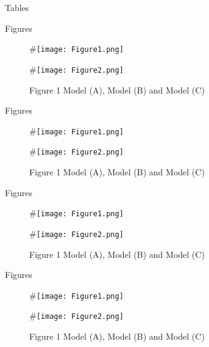 \begin{frame}[t]
\begin{columns}[t]
\begin{column}{\onecolwid}
\begin{alertblock}{Tables}
\end{alertblock}
\begin{alertblock}{Figures}
\begin{figure}[H]
	\centering
	\begin{minipage}[b]{0.5\linewidth}
		#\texttt{[image: Figure1.png]}
	\end{minipage}\hfill
	\begin{minipage}[b]{0.5\linewidth}
		#\texttt{[image: Figure2.png]}
	\end{minipage}\hfill
	\caption{Figure 1 Model (A), Model (B) and Model (C)}
	\label{fig:Figure1}
\end{figure}
\end{alertblock}

\begin{alertblock}{Figures}
\begin{figure}[H]
	\centering
	\begin{minipage}[b]{0.5\linewidth}
		#\texttt{[image: Figure1.png]}
	\end{minipage}\hfill
	\begin{minipage}[b]{0.5\linewidth}
		#\texttt{[image: Figure2.png]}
	\end{minipage}\hfill
	\caption{Figure 1 Model (A), Model (B) and Model (C)}
	\label{fig:Figure1}
\end{figure}
\end{alertblock}

\begin{alertblock}{Figures}
\begin{figure}[H]
	\centering
	\begin{minipage}[b]{0.5\linewidth}
		#\texttt{[image: Figure1.png]}
	\end{minipage}\hfill
	\begin{minipage}[b]{0.5\linewidth}
		#\texttt{[image: Figure2.png]}
	\end{minipage}\hfill
	\caption{Figure 1 Model (A), Model (B) and Model (C)}
	\label{fig:Figure1}
\end{figure}
\end{alertblock}

\begin{alertblock}{Figures}
\begin{figure}[H]
	\centering
	\begin{minipage}[b]{0.5\linewidth}
		#\texttt{[image: Figure1.png]}
	\end{minipage}\hfill
	\begin{minipage}[b]{0.5\linewidth}
		#\texttt{[image: Figure2.png]}
	\end{minipage}\hfill
	\caption{Figure 1 Model (A), Model (B) and Model (C)}
	\label{fig:Figure1}
\end{figure}
\end{alertblock}


\end{column}
\end{columns}
\end{frame}
